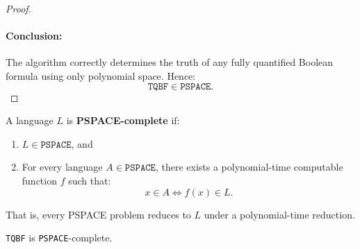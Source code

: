 \begin{proof}
\paragraph{Conclusion:}
The algorithm correctly determines the truth of any fully quantified Boolean formula using only polynomial space. Hence:
\[
\texttt{TQBF} \in \texttt{PSPACE}.
\]
\end{proof}

\begin{definition}
    A language $L$ is \textbf{PSPACE-complete} if:
    \begin{enumerate}
        \item $L \in \texttt{PSPACE}$, and
        \item For every language $A \in \texttt{PSPACE}$, there exists a polynomial-time computable function $f$ such that:
        \[
        x \in A \iff f(x) \in L.
        \]
    \end{enumerate}
    That is, every PSPACE problem reduces to $L$ under a polynomial-time reduction.
    \end{definition}
    
    \begin{theorem}
    \texttt{TQBF} is \texttt{PSPACE}-complete.
    \end{theorem}
    
